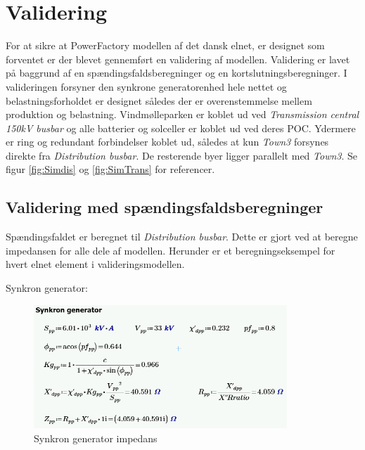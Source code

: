 
\label{Validering}
\section{Validering}

For at sikre at PowerFactory modellen af det dansk elnet, er designet som forventet er der blevet gennemført en validering af modellen. Validering er lavet på baggrund af en spændingsfaldsberegninger og en kortslutningsberegninger. I valideringen forsyner den synkrone generatorenhed hele nettet og belastningsforholdet er designet således der er overenstemmelse mellem produktion og belastning. Vindmølleparken er koblet ud ved \textit{Transmission central 150kV busbar} og alle batterier og solceller er koblet ud ved deres POC. Ydermere er ring og redundant forbindelser koblet ud, således at kun \textit{Town3} forsynes direkte fra \textit{Distribution busbar}. De resterende byer ligger parallelt med \textit{Town3}. Se figur \ref{fig:Simdis} og \ref{fig:SimTrans} for referencer.

\subsection{Validering med spændingsfaldsberegninger}
Spændingsfaldet er beregnet til \textit{Distribution busbar}. Dette er gjort ved at beregne impedansen for alle dele af modellen. Herunder er et beregningseksempel for hvert elnet element i valideringsmodellen.

Synkron generator:
\begin{figure}[H] %
	\centering
	\includegraphics[width=0.85\textwidth]{figurer/Synkron_generator_validering}
	\caption{Synkron generator impedans}
	\label{fig:SGimpedans}
\end{figure}

